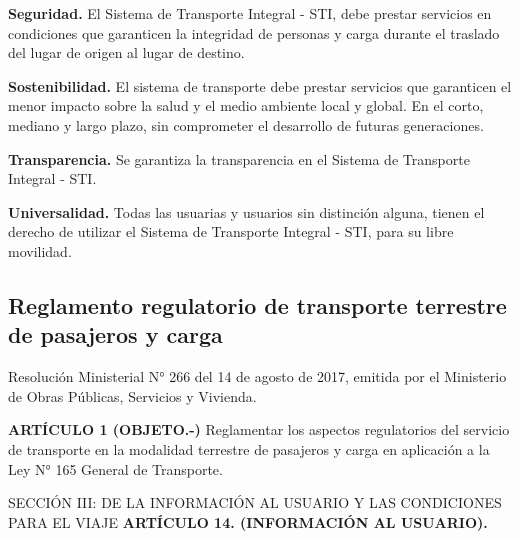 	\textbf{Seguridad.} El Sistema de Transporte Integral - STI, debe prestar servicios en condiciones que garanticen la integridad de personas y carga durante el traslado del lugar de origen al lugar de destino.
	
	\textbf{Sostenibilidad.} El sistema de transporte debe prestar servicios que garanticen el menor impacto sobre la salud y el medio ambiente local y global. En el corto, mediano y largo plazo, sin comprometer el desarrollo de futuras generaciones.
	
	\textbf{Transparencia.} Se garantiza la transparencia en el Sistema de Transporte Integral - STI.
	
	\textbf{Universalidad.} Todas las usuarias y usuarios sin distinción alguna, tienen el derecho de utilizar el Sistema de Transporte Integral - STI, para su libre movilidad.
	
	\subsection{Reglamento regulatorio de transporte terrestre de pasajeros y carga}
	
	Resolución Ministerial N° 266 del 14 de agosto de 2017, emitida por el Ministerio de Obras Públicas, Servicios y Vivienda.
	
	\textbf{ARTÍCULO 1 (OBJETO.-)} Reglamentar los aspectos regulatorios del servicio de
	transporte en la modalidad terrestre de pasajeros y carga en aplicación a la Ley N° 165 General de Transporte.
	
	SECCIÓN III: DE LA INFORMACIÓN AL USUARIO Y LAS CONDICIONES	PARA EL VIAJE
	\textbf{ARTÍCULO 14. (INFORMACIÓN AL USUARIO).}
	
